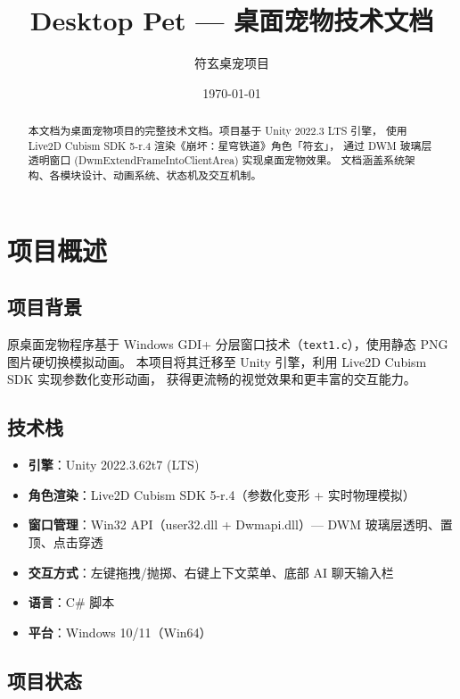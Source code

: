 \documentclass[12pt,a4paper]{ctexart}
\title{\vspace{-2cm}Desktop Pet --- 桌面宠物技术文档}
\author{符玄桌宠项目}
\date{\today}
\begin{document}
\maketitle
\thispagestyle{empty}

\begin{abstract}
本文档为桌面宠物项目的完整技术文档。项目基于 Unity 2022.3 LTS 引擎，
使用 Live2D Cubism SDK 5-r.4 渲染《崩坏：星穹铁道》角色「符玄」，
通过 DWM 玻璃层透明窗口 (DwmExtendFrameIntoClientArea) 实现桌面宠物效果。
文档涵盖系统架构、各模块设计、动画系统、状态机及交互机制。
\end{abstract}

\tableofcontents
\newpage

\section{项目概述}

\subsection{项目背景}

原桌面宠物程序基于 Windows GDI+ 分层窗口技术（\texttt{text1.c}），使用静态 PNG 图片硬切换模拟动画。
本项目将其迁移至 Unity 引擎，利用 Live2D Cubism SDK 实现参数化变形动画，
获得更流畅的视觉效果和更丰富的交互能力。

\subsection{技术栈}

\begin{itemize}
    \item \textbf{引擎}：Unity 2022.3.62t7 (LTS)
    \item \textbf{角色渲染}：Live2D Cubism SDK 5-r.4（参数化变形 + 实时物理模拟）
    \item \textbf{窗口管理}：Win32 API（user32.dll + Dwmapi.dll）--- DWM 玻璃层透明、置顶、点击穿透
    \item \textbf{交互方式}：左键拖拽/抛掷、右键上下文菜单、底部 AI 聊天输入栏
    \item \textbf{语言}：C\# 脚本
    \item \textbf{平台}：Windows 10/11（Win64）
\end{itemize}

\subsection{项目状态}
\end{document}
